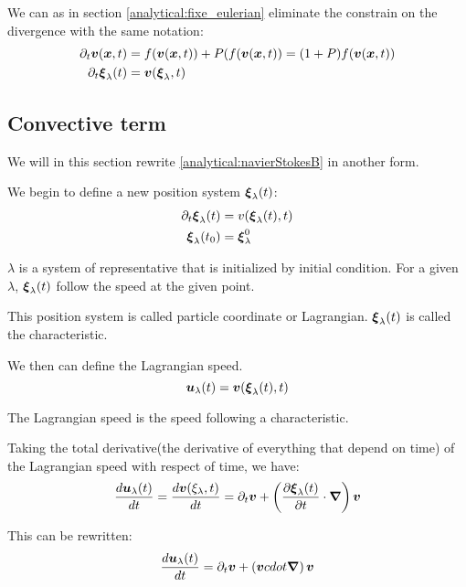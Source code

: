 We can as in section \ref{analytical:fixe_eulerian} eliminate the constrain on the divergence with the same notation:
\begin{align}
\partial_t {\boldsymbol {v}}({\boldsymbol {x}} ,t)&=f({\boldsymbol {v}}({\boldsymbol {x}},t))+P(f({\boldsymbol {v}}({\boldsymbol {x}},t))=(1+P)f({\boldsymbol {v}}({\boldsymbol {x}},t))\\
\partial_t {\boldsymbol {\xi}}_{\lambda}(t)&={\boldsymbol {v}}({\boldsymbol {\xi}}_{\lambda},t)
\end{align}

\subsection{Convective term}
\label{analytical:convectif}
We will in this section rewrite \ref{analytical:navierStokesB} in another form.

We begin to define a new position system ${\boldsymbol {\xi}}_{\lambda}(t)$:
\begin{subequations}
\begin{align}
 \partial_t {\boldsymbol {\xi}}_{\lambda}(t)&=v({\boldsymbol {\xi}}_{\lambda}(t),t)\\
 {\boldsymbol {\xi}}_{\lambda}(t_0)&={\boldsymbol {\xi}}^{0}_{\lambda}
\end{align}
\end{subequations}

$\lambda$ is a system of representative that is initialized by initial condition.
For a given $\lambda$, ${\boldsymbol {\xi}}_{\lambda}(t)$ follow the speed at the given point.

This position system is called particle coordinate or Lagrangian.
${\boldsymbol {\xi}}_\lambda(t)$ is called the characteristic.

We then can define the Lagrangian speed.
\begin{equation}
 {\boldsymbol {u}}_{\lambda}(t)={\boldsymbol {v}}({\boldsymbol {\xi}}_{\lambda}(t),t)
\end{equation}

The Lagrangian speed is the speed following a characteristic.

Taking the total derivative(the derivative of everything that depend on time) of the Lagrangian speed with respect of time, we have:
\begin{equation}
\frac{d {\boldsymbol {u}}_{\lambda}(t)}{d t}=\frac{d {\boldsymbol {v}}(\xi_{\lambda},t)}{d t}=\partial_t {\boldsymbol {v}}+\left(\frac{\partial {\boldsymbol {\xi}}_{\lambda}(t)}{\partial t}\cdot{\boldsymbol {\nabla}}\right){\boldsymbol {v}}
\end{equation}

This can be rewritten:
\begin{equation}
\frac{d {\boldsymbol {u}}_{\lambda}(t)}{d t}=\partial_t {\boldsymbol {v}}+\left({\boldsymbol {v}} cdot{\boldsymbol {\nabla}}\right){\boldsymbol {v}}
\end{equation}

